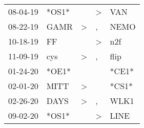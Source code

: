\begin{supertabular}{p{0.07\textwidth}p{0.06\textwidth}p{0.02\textwidth}p{0.02\textwidth}p{0.06\textwidth}}
          08-04-19\textsuperscript{} &                            *OS1* &                  &     \textgreater &            VAN\textsuperscript{} \\
          08-22-19\textsuperscript{} &           GAMR\textsuperscript{} &     \textgreater &                , &           NEMO\textsuperscript{} \\
          10-18-19\textsuperscript{} &             FF\textsuperscript{} &                  &     \textgreater &            n2f\textsuperscript{} \\
          11-09-19\textsuperscript{} &            cys\textsuperscript{} &     \textgreater &                , &           flip\textsuperscript{} \\
          01-24-20\textsuperscript{} &                            *OE1* &                  &                  &                            *CE1* \\
          02-01-20\textsuperscript{} &           MITT\textsuperscript{} &     \textgreater &                  &                            *CS1* \\
          02-26-20\textsuperscript{} &           DAYS\textsuperscript{} &     \textgreater &                , &           WLK1\textsuperscript{} \\
          09-02-20\textsuperscript{} &                            *OS1* &                  &     \textgreater &           LINE\textsuperscript{} \\
\end{supertabular}
